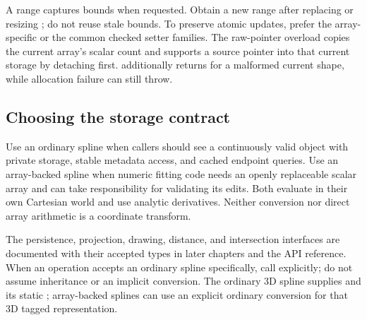 A range captures bounds when requested. Obtain a new range after replacing
or resizing ; do not reuse stale bounds. To preserve atomic
updates, prefer the array-specific
 or the common checked setter
families. The raw-pointer overload copies the current array's scalar count
and supports a source pointer into that current storage by detaching first.
 additionally returns  for a malformed current
shape, while allocation failure can still throw.

\subsection{Choosing the storage contract}

Use an ordinary spline when callers should see a continuously valid object
with private storage, stable metadata access, and cached endpoint queries.
Use an array-backed spline when numeric fitting code needs an openly
replaceable scalar array and can take responsibility for validating its
edits. Both evaluate in their own Cartesian world and use analytic
derivatives. Neither conversion nor direct array arithmetic is a coordinate
transform.

The persistence, projection, drawing, distance, and intersection interfaces
are documented with their accepted types in later chapters and the API
reference. When an operation accepts an ordinary spline specifically, call
 explicitly; do not assume inheritance or an implicit
conversion. The ordinary 3D spline supplies  and its static
; array-backed splines can use an explicit ordinary conversion
for that 3D tagged representation.
